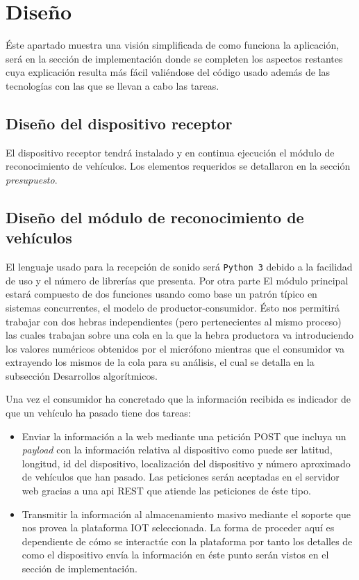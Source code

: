 \chapter{Diseño}

Éste apartado muestra una visión simplificada de como funciona la aplicación, será en la sección de implementación donde se completen los aspectos restantes cuya explicación resulta más fácil valiéndose del código usado además de las tecnologías con las que se llevan a cabo las tareas.

\section{Diseño del dispositivo receptor}

El dispositivo receptor tendrá instalado y en continua ejecución el módulo de reconocimiento de vehículos. Los elementos requeridos se detallaron en la sección \textit{presupuesto}.

\section{Diseño del módulo de reconocimiento de vehículos}
El lenguaje usado para la recepción de sonido será {\tt Python 3} debido a la facilidad de uso y el número de librerías que presenta. Por otra parte
El módulo principal estará compuesto de dos funciones usando como base un patrón típico en sistemas concurrentes, el  modelo de productor-consumidor. Ésto nos permitirá trabajar con dos hebras independientes (pero pertenecientes al mismo proceso) las cuales trabajan sobre una cola en la que la hebra productora va introduciendo los valores numéricos obtenidos por el micrófono mientras que el consumidor va extrayendo los mismos de la cola para su análisis, el cual se detalla en la subsección Desarrollos algorítmicos.

Una vez el consumidor ha concretado que la información recibida es indicador de que un vehículo ha pasado tiene dos tareas:

\begin{itemize}
  \item Enviar la información a la web mediante una petición POST que incluya un \textit{payload} con la información relativa al dispositivo como puede ser latitud, longitud, id del dispositivo, localización del dispositivo y número aproximado de vehículos que han pasado. Las peticiones serán aceptadas en el servidor web gracias a una api REST que atiende las peticiones de éste tipo.
  \item Transmitir la información al almacenamiento masivo mediante el soporte que nos provea la plataforma IOT seleccionada. La forma de proceder aquí es dependiente de cómo se interactúe con la plataforma por tanto los detalles de como el dispositivo envía la información en éste punto serán vistos en el sección de implementación.
\end{itemize}

